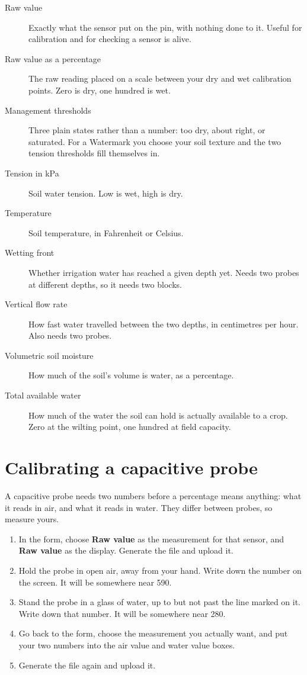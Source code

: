 \documentclass[11pt,a4paper]{article}
\begin{document}
\begin{description}
  \item[Raw value] Exactly what the sensor put on the pin, with nothing done to
        it. Useful for calibration and for checking a sensor is alive.
  \item[Raw value as a percentage] The raw reading placed on a scale between
        your dry and wet calibration points. Zero is dry, one hundred is wet.
  \item[Management thresholds] Three plain states rather than a number: too
        dry, about right, or saturated. For a Watermark you choose your soil
        texture and the two tension thresholds fill themselves in.
  \item[Tension in kPa] Soil water tension. Low is wet, high is dry.
  \item[Temperature] Soil temperature, in Fahrenheit or Celsius.
  \item[Wetting front] Whether irrigation water has reached a given depth yet.
        Needs two probes at different depths, so it needs two blocks.
  \item[Vertical flow rate] How fast water travelled between the two depths,
        in centimetres per hour. Also needs two probes.
  \item[Volumetric soil moisture] How much of the soil's volume is water,
        as a percentage.
  \item[Total available water] How much of the water the soil can hold is
        actually available to a crop. Zero at the wilting point, one hundred at
        field capacity.
\end{description}

\section{Calibrating a capacitive probe}
\label{sec:calibration}

A capacitive probe needs two numbers before a percentage means anything: what
it reads in air, and what it reads in water. They differ between probes, so
measure yours.

\begin{enumerate}
  \item In the form, choose \textbf{Raw value} as the measurement for that
        sensor, and \textbf{Raw value} as the display. Generate the file and
        upload it.
  \item Hold the probe in open air, away from your hand. Write down the number
        on the screen. It will be somewhere near 590.
  \item Stand the probe in a glass of water, up to but not past the line marked
        on it. Write down that number. It will be somewhere near 280.
  \item Go back to the form, choose the measurement you actually want, and put
        your two numbers into the air value and water value boxes.
  \item Generate the file again and upload it.
\end{enumerate}
\end{document}
